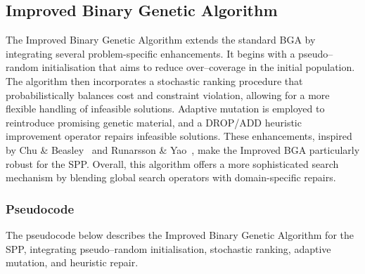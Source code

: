 \documentclass[12pt]{article}
\begin{document}
\subsection{Improved Binary Genetic Algorithm}
The Improved Binary Genetic Algorithm extends the standard BGA by integrating several problem-specific enhancements. It begins with a pseudo–random initialisation that aims to reduce over–coverage in the initial population. The algorithm then incorporates a stochastic ranking procedure that probabilistically balances cost and constraint violation, allowing for a more flexible handling of infeasible solutions. Adaptive mutation is employed to reintroduce promising genetic material, and a DROP/ADD heuristic improvement operator repairs infeasible solutions. These enhancements, inspired by Chu \& Beasley~\cite{ChuAndBeasley1998} and Runarsson \& Yao~\cite{RunarssonYao2000}, make the Improved BGA particularly robust for the SPP. Overall, this algorithm offers a more sophisticated search mechanism by blending global search operators with domain-specific repairs.

\subsubsection{Pseudocode}
The pseudocode below describes the Improved Binary Genetic Algorithm for the SPP, integrating pseudo–random initialisation, stochastic ranking, adaptive mutation, and heuristic repair.
\end{document}
